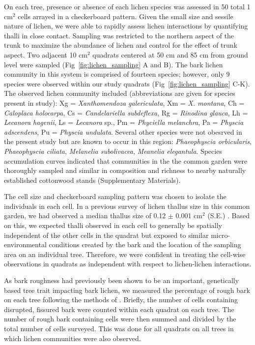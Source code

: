 \documentclass[9pt,twocolumn,twoside,lineno]{pnas-new}
\begin{document}
{On each tree, presence or absence of each lichen species was assessed
in 50 total 1 cm$^2$ cells arrayed in a checkerboard pattern. Given
the small size and sessile nature of lichen, we were able to rapidly
assess lichen interactions by quantifying thalli in close
contact. Sampling was restricted to the northern aspect of the trunk
to maximize the abundance of lichen and control for the effect of
trunk aspect. Two adjacent 10 cm$^2$ quadrats centered at 50 cm and 85
cm from ground level were sampled (Fig~\ref{fig:lichen_sampling} A and
B). The bark lichen community in this system is comprised of fourteen
species; however, only 9 species were observed within our study
quadrats (Fig~\ref{fig:lichen_sampling} C-K). The observed lichen
community included (abbreviations are given for species present in
study): Xg = \textit{Xanthomendoza galericulata}, Xm =
\textit{X. montana}, Ch = \textit{Caloplaca holocarpa}, Cs =
\textit{Candelariella subdeflexa}, Rg = \textit{Rinodina glauca}, Lh =
\textit{Lecanora hagenii}, Ls = \textit{Lecanora} sp., Pm =
\textit{Phyciella melanchra}, Pa = \textit{Physcia adscendens}, Pu =
\textit{Physcia undulata}. Several other species were not obesrved in
the present study but are known to occur in this region:
\textit{Phaeophyscia orbicularis}, \textit{Phaeophyscia ciliata},
\textit{Melanelia subolivacea}, \textit{Meanelia elegantula}. Species
accumulation curves indicated that communities in the the common
garden were thoroughly sampled and similar in composition and richness
to nearby naturally established cottonwood stands (Supplementary
Materials).

The cell size and checkerboard sampling pattern was chosen to isolate
the individuals in each cell. In a previous survey of lichen thallus
size in this common garden, we had observed a median thallus size of
0.12 $\pm$ 0.001 cm$^2$ (S.E.) \cite{Lamit2015}. Based on this, we
expected thalli observed in each cell to generally be spatially
independent of the other cells in the quadrat but exposed to similar
micro-environmental conditions created by the bark and the location of
the sampling area on an individual tree. Therefore, we were confident
in treating the cell-wise observations in quadrats as independent with
respect to lichen-lichen interactions.

As bark roughness had previously been shown to be an important,
genetically based tree trait impacting bark lichen, we measured the
percentage of rough bark on each tree following the methods of
\citep{Lamit2012}. Briefly, the number of cells containing disrupted,
fissured bark were counted within each quadrat on each tree. The
number of rough bark containing cells were then summed and divided by
the total number of cells surveyed. This was done for all quadrats on
all trees in which lichen communities were also observed.


}
\end{document}
